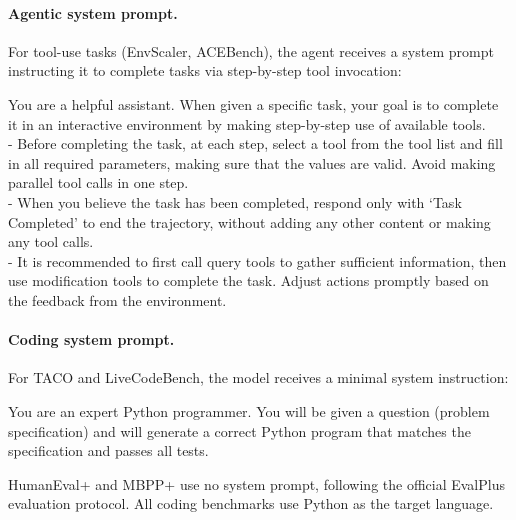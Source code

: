 \documentclass{article} %
\begin{document}
\paragraph{Agentic system prompt.}
For tool-use tasks (EnvScaler, ACEBench), the agent receives a system prompt instructing it to complete tasks via step-by-step tool invocation:

\begin{tcolorbox}[colback=SeaGreen!6, colframe=SeaGreen!50!black, fontupper=\ttfamily\scriptsize, boxrule=0.5pt, left=4pt, right=4pt, top=3pt, bottom=3pt, title={\small\bfseries Agentic system prompt (EnvScaler / ACEBench)}]
You are a helpful assistant. When given a specific task, your goal is to complete it in an interactive environment by making step-by-step use of available tools.\\
- Before completing the task, at each step, select a tool from the tool list and fill in all required parameters, making sure that the values are valid. Avoid making parallel tool calls in one step.\\
- When you believe the task has been completed, respond only with `Task Completed' to end the trajectory, without adding any other content or making any tool calls.\\
- It is recommended to first call query tools to gather sufficient information, then use modification tools to complete the task. Adjust actions promptly based on the feedback from the environment.
\end{tcolorbox}

\paragraph{Coding system prompt.}
For TACO and LiveCodeBench, the model receives a minimal system instruction:

\begin{tcolorbox}[colback=SeaGreen!6, colframe=SeaGreen!50!black, fontupper=\ttfamily\scriptsize, boxrule=0.5pt, left=4pt, right=4pt, top=3pt, bottom=3pt, title={\small\bfseries Coding system prompt (TACO / LiveCodeBench)}]
You are an expert Python programmer. You will be given a question (problem specification) and will generate a correct Python program that matches the specification and passes all tests.
\end{tcolorbox}

\noindent HumanEval+ and MBPP+ use no system prompt, following the official EvalPlus evaluation protocol. All coding benchmarks use Python as the target language.
\end{document}
